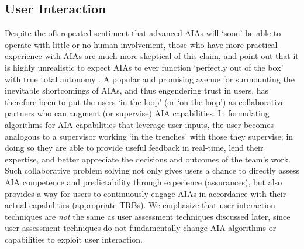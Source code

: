 \subsection{User Interaction} \label{sec:user_interaction}
Despite the oft-repeated sentiment that advanced AIAs will `soon' be able to operate with little or no human involvement, those who have more practical experience with AIAs are much more skeptical of this claim, and point out that it is highly unrealistic to expect AIAs to ever function `perfectly out of the box' with true total autonomy \cite{Bradshaw2013-ck}. 
A popular and promising avenue for surmounting the inevitable shortcomings of AIAs, and thus engendering trust in users, has therefore been to put the users `in-the-loop' (or `on-the-loop') as collaborative partners who can augment (or supervise) AIA capabilities. 
In formulating algorithms for AIA capabilities that leverage user inputs, the user becomes analogous to a supervisor working `in the trenches' with those they supervise; in doing so they are able to provide useful feedback in real-time, lend their expertise, and better appreciate the decisions and outcomes of the team's work. Such collaborative problem solving not only gives users a chance to directly assess AIA competence and predictability through experience (assurances), but also provides a way for users to continuously engage AIAs in accordance with their actual capabilities (appropriate TRBs). 
We emphasize that user interaction techniques are \emph{not} the same as user assessment techniques discussed later, since user assessment techniques do not fundamentally change AIA algorithms or capabilities to exploit user interaction. %


